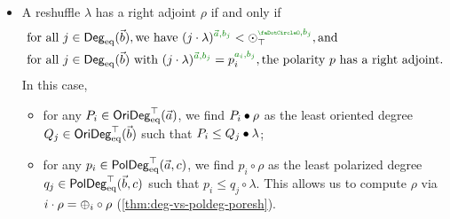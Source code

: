 \documentclass[a4paper]{memoir}
\begin{document}
\begin{theorem}
\begin{enumerate}
\begin{itemize}
\begin{align}
				\label{eq:poresh-withl-crit2}
			\end{align}
			In this case,
			\begin{itemize}
				\item for any $Q_j \in \oridegeqtop(\vec b)$, we find $Q_j \oriof \lambda$ as the greatest oriented degree $P_i \in \oridegeqtop(\vec a)$ such that $P_i \oriof \rho \leq Q_j$;
				\item for any $q_j \in \poldegeqtop(\vec b, c)$, we find $q_j \circ \lambda$ as the greatest polarized degree $p_i \in \poldegeqtop(\vec a, c)$ such that $p_i \circ \rho \leq q_j$. This allows us to compute $\lambda$ via $j \cdot \lambda = \pospol_j \circ \lambda$ (\cref{thm:deg-vs-poldeg-poresh}).
			\end{itemize}
			
			\item A reshuffle $\lambda$ has a right adjoint $\rho$ if and only if
			\begin{align}
				&\text{for all } j \in \Degeq(\vec b), \text{we have } (j \cdot \lambda)\pmrhom{\vec a}{b_j} < \nonpol_\top \pmrhom{\npolar}{b_j}, \text{and} \label{eq:poresh-withr-crit1} \\
				&\text{for all } j \in \Degeq(\vec b) \text{ with } (j \cdot \lambda)\pmrhom{\vec a}{b_j} = p_i \pmrhom{a_i}{b_j}, \text{the polarity $p$ has a right adjoint}.
				\label{eq:poresh-withr-crit2}
			\end{align}
			In this case,
			\begin{itemize}
				\item for any $P_i \in \oridegeqtop(\vec a)$, we find $P_i \mathbin{\bullet} \rho$ as the least oriented degree $Q_j \in \oridegeqtop(\vec b)$ such that $P_i \leq Q_j \mathbin{\bullet} \lambda$;
				\item for any $p_i \in \poldegeqtop(\vec a, c)$, we find $p_i \circ \rho$ as the least polarized degree $q_j \in \poldegeqtop(\vec b, c)$ such that $p_i \leq q_j \circ \lambda$. This allows us to compute $\rho$ via $i \cdot \rho = {\oplus}_i \circ \rho$ (\cref{thm:deg-vs-poldeg-poresh}).
			\end{itemize}
		\end{itemize}
	\end{enumerate}
\end{theorem}
\end{document}
